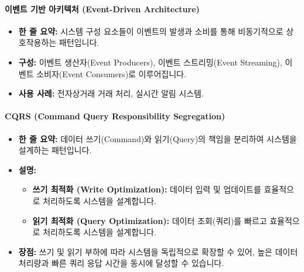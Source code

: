 \documentclass[11pt,a4paper]{article}
\begin{document}
\paragraph{이벤트 기반 아키텍처 (Event-Driven Architecture)}
\begin{itemize}
    \item \textbf{한 줄 요약:} 시스템 구성 요소들이 이벤트의 발생과 소비를 통해 비동기적으로 상호작용하는 패턴입니다.
    \item \textbf{구성:} 이벤트 생산자(Event Producers), 이벤트 스트리밍(Event Streaming), 이벤트 소비자(Event Consumers)로 이루어집니다.
    \item \textbf{사용 사례:} 전자상거래 거래 처리, 실시간 알림 시스템.
\end{itemize}

\paragraph{CQRS (Command Query Responsibility Segregation)}
\begin{itemize}
    \item \textbf{한 줄 요약:} 데이터 쓰기(Command)와 읽기(Query)의 책임을 분리하여 시스템을 설계하는 패턴입니다.
    \item \textbf{설명:}
    \begin{itemize}
        \item \textbf{쓰기 최적화 (Write Optimization):} 데이터 입력 및 업데이트를 효율적으로 처리하도록 시스템을 설계합니다.
        \item \textbf{읽기 최적화 (Query Optimization):} 데이터 조회(쿼리)를 빠르고 효율적으로 처리하도록 시스템을 설계합니다.
    \end{itemize}
    \item \textbf{장점:} 쓰기 및 읽기 부하에 따라 시스템을 독립적으로 확장할 수 있어, 높은 데이터 처리량과 빠른 쿼리 응답 시간을 동시에 달성할 수 있습니다.
\end{itemize}
\end{document}
